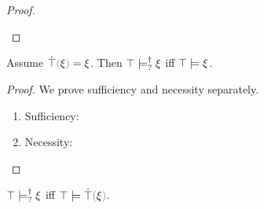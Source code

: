 \begin{proof}
\begin{enumerate}
\begin{byCases}
    \end{byCases}
      
    \resetpfcounter
  \end{enumerate}
\end{proof}

\begin{lemma}
\label{lem:truify-satormay-satisfy}
  Assume $\ctruify{\xi}=\xi$. Then $\top \models_{?}^{\dag} \xi$ iff $\top \models \xi$.
\end{lemma}
\begin{proof}
We prove sufficiency and necessity separately.
\begin{enumerate}
\item Sufficiency:
    
\item Necessity:
    
\end{enumerate}
\end{proof}

\begin{theorem}
\label{thrm:exhaustive-truify}
  $\top \models_{?}^{\dag} \xi$ iff $\csatisfy{\ctruth}{\ctruify{\xi}}$.
\end{theorem}

